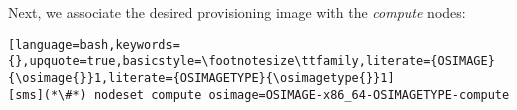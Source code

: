 Next, we associate the desired provisioning image with the {\em compute} nodes:

\begin{lstlisting}[language=bash,keywords={},upquote=true,basicstyle=\footnotesize\ttfamily,literate={OSIMAGE}{\osimage{}}1,literate={OSIMAGETYPE}{\osimagetype{}}1]
[sms](*\#*) nodeset compute osimage=OSIMAGE-x86_64-OSIMAGETYPE-compute
\end{lstlisting}
